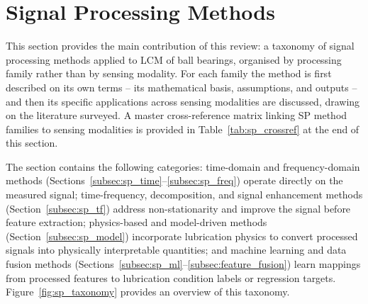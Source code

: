 \section{Signal Processing Methods}
\label{sec:sp}

This section provides the main contribution of this review: a taxonomy of signal processing methods applied to LCM of ball bearings, organised by processing family rather than by sensing modality. For each family the method is first described on its own terms -- its mathematical basis, assumptions, and outputs -- and then its specific applications across sensing modalities are discussed, drawing on the literature surveyed. A master cross-reference matrix linking SP method families to sensing modalities is provided in Table~\ref{tab:sp_crossref} at the end of this section.

The section contains the following categories: time-domain and frequency-domain methods (Sections~\ref{subsec:sp_time}--\ref{subsec:sp_freq}) operate directly on the measured signal; time-frequency, decomposition, and signal enhancement methods (Section~\ref{subsec:sp_tf}) address non-stationarity and improve the signal before feature extraction; physics-based and model-driven methods (Section~\ref{subsec:sp_model}) incorporate lubrication physics to convert processed signals into physically interpretable quantities; and machine learning and data fusion methods (Sections~\ref{subsec:sp_ml}--\ref{subsec:feature_fusion}) learn mappings from processed features to lubrication condition labels or regression targets. Figure~\ref{fig:sp_taxonomy} provides an overview of this taxonomy.

